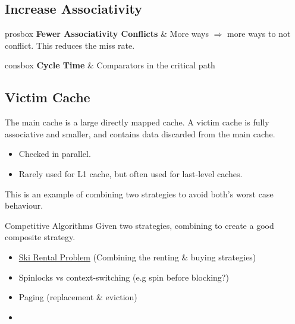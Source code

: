 \subsection{Increase Associativity}

\begin{tabbox}{prosbox}
    \textbf{Fewer Associativity Conflicts} & More ways $\Rightarrow$ more ways to not conflict. This reduces the miss rate.\\
\end{tabbox}
\begin{tabbox}{consbox}
    \textbf{Cycle Time} & Comparators in the critical path
\end{tabbox}

\subsection{Victim Cache}
The main cache is a large directly mapped cache. A victim cache is fully associative and smaller, and contains data discarded from the main cache.
\begin{itemize}
    \item Checked in parallel.
    \item Rarely used for L1 cache, but often used for last-level caches.
\end{itemize}
This is an example of combining two strategies to avoid both's worst case behaviour.
\begin{sidenotebox}{Competitive Algorithms}
    Given two strategies, combining to create a good composite strategy.
    \begin{itemize}
        \item \href{https://en.wikipedia.org/wiki/Ski_rental_problem}{Ski Rental Problem} (Combining the renting \& buying strategies)
        \item Spinlocks vs context-switching (e.g spin before blocking?)
        \item Paging (replacement \& eviction)
        \item 
    \end{itemize}
\end{sidenotebox}

